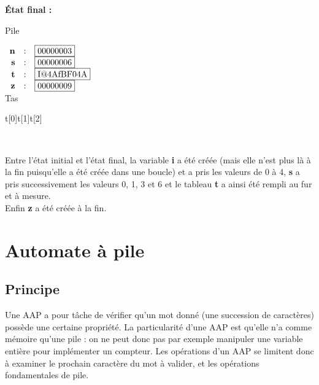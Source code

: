 \documentclass[a4paper,10pt]{book} %
\begin{document}
\bigskip \bigskip
\textbf{État final :}

\begin{multicols}{2} \begin{center}
Pile\\
\phantom{a}

$\begin{array}{rcl}
\textbf{n} &:& \fbox{00000003}\\
\textbf{s} &:& \fbox{00000006}\\
\textbf{t} &:& \fbox{I@4AfBF04A}\\
\textbf{z} &:& \fbox{00000009}
\end{array}$\\

Tas

\phantom{aaaa}t[0]\phantom{aaaaaa}t[1]\phantom{aaaaaa}t[2]\phantom{}

\\

\phantom{a}

\phantom{a}

\phantom{a}

\end{center}\end{multicols}

\bigskip\bigskip

Entre l'état initial et l'état final, la variable \textbf{i} a été créée (mais elle n'est plus là à la fin puisqu'elle a été créée dans une boucle) et a pris les valeurs de 0 à 4, \textbf{s} a pris successivement les valeurs 0, 1, 3 et 6 et le tableau \textbf{t} a ainsi été rempli au fur et à mesure.\\
Enfin \textbf{z} a été créée à la fin.

\newpage

\section{Automate à pile}
\subsection{Principe}
Une AAP a pour tâche de vérifier qu’un mot donné (une succession de caractères) possède une certaine propriété. La particularité d’une AAP est qu’elle n’a comme mémoire qu’une pile : on ne peut donc pas par exemple manipuler une variable entière pour implémenter un compteur. Les opérations d’un AAP se limitent donc à examiner le prochain caractère du mot à valider, et les opérations fondamentales de pile.
\end{document}
